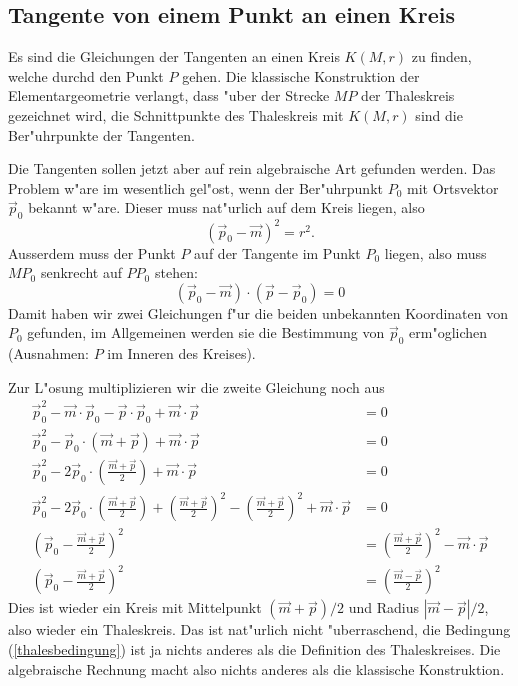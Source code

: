 \subsection{Tangente von einem Punkt an einen Kreis}
Es sind die Gleichungen der Tangenten an einen Kreis $K(M,r)$ zu finden,
welche durchd den Punkt $P$ gehen. Die klassische Konstruktion der
Elementargeometrie verlangt, dass "uber der Strecke $MP$ der
Thaleskreis gezeichnet wird, die Schnittpunkte des Thaleskreis mit
$K(M,r)$ sind die Ber"uhrpunkte der Tangenten.

Die Tangenten sollen jetzt aber auf rein algebraische Art gefunden
werden. Das Problem w"are im wesentlich gel"ost, wenn der Ber"uhrpunkt $P_0$
mit Ortsvektor
$\vec p_0$ bekannt w"are. Dieser muss nat"urlich auf dem Kreis liegen,
also 
\[
(\vec p_0-\vec m)^2=r^2.
\]
Ausserdem muss der Punkt $P$ auf der Tangente im Punkt $P_0$ liegen,
also muss $MP_0$ senkrecht auf $PP_0$ stehen:
\begin{equation}
(\vec p_0-\vec m)\cdot(\vec p-\vec p_0)=0
\label{thalesbedingung}
\end{equation}
Damit haben wir zwei Gleichungen f"ur die beiden unbekannten Koordinaten
von $P_0$ gefunden, im Allgemeinen werden sie die Bestimmung von $\vec p_0$
erm"oglichen (Ausnahmen: $P$ im Inneren des Kreises).

Zur L"osung multiplizieren wir die zweite Gleichung noch aus
\begin{align*}
\vec p_0^2-\vec m\cdot\vec p_0-\vec p\cdot\vec p_0+\vec m\cdot\vec p&=0
\\
\vec p_0^2-\vec p_0\cdot (\vec m+\vec p)+\vec m\cdot\vec p&=0
\\
\vec p_0^2-2\vec p_0\cdot \left(\frac{\vec m+\vec p}{2}\right)+\vec m\cdot\vec p&=0
\\
\vec p_0^2-2\vec p_0\cdot \left(\frac{\vec m+\vec p}{2}\right)+
\left(\frac{\vec m+\vec p}2\right)^2
-\left(\frac{\vec m+\vec p}2\right)^2
+\vec m\cdot\vec p&=0
\\
\left(\vec p_0- \frac{\vec m+\vec p}{2}\right)^2
&=
\left(\frac{\vec m+\vec p}2\right)^2
-\vec m\cdot\vec p
\\
\left(\vec p_0- \frac{\vec m+\vec p}{2}\right)^2
&=
\left(\frac{\vec m-\vec p}2\right)^2
\end{align*}
Dies ist wieder ein Kreis mit Mittelpunkt $(\vec m+\vec p)/2$ und
Radius $|\vec m-\vec p|/2$, also wieder ein Thaleskreis. Das ist
nat"urlich nicht "uberraschend, die Bedingung (\ref{thalesbedingung})
ist ja nichts anderes als die Definition des Thaleskreises.
Die algebraische Rechnung macht also nichts anderes als die klassische
Konstruktion.
